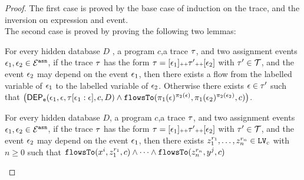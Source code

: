 {\begin{proof}
%
The first case is proved by the base case of induction on the trace, and the inversion on expression and event.
\\
The second case is proved by proving the following two lemmas:
\begin{lem}
  \label{lem:depevents_exist}
For every hidden database $D$ , a program $c$,a trace $\mathtt{\tau}$, and two assignment events 
$\mathtt{\epsilon}_1, \mathtt{\epsilon}_2 \in \mathcal{E}^{\mathtt{{asn}}}$,
if the trace $\mathtt{\tau}$ has the form $\mathtt{\tau} = [\mathtt{\epsilon}_1] {\scriptscriptstyle ++} \mathtt{\tau}' {\scriptscriptstyle ++} [\mathtt{\epsilon}_2]$ with $\mathtt{\tau}' \in \mathcal{T}$, 
and the event $\mathtt{\epsilon}_2$ may depend on the event $\mathtt{\epsilon}_1$, 
then there exists a flow from the labelled variable of $\mathtt{\epsilon}_1$ to 
the labelled variable of $\mathtt{\epsilon}_2$.  
 Otherwise there exists
$\mathtt{\epsilon} \in \mathtt{\tau}'$ such that
$\left( 		
    \eventdep(\event_1, \event, \trace[\event_1:\event], c, D)
\land 
\flowsto(\pi_1(\event)^{\pi_2(\event)}, \pi_1(\event_2)^{\pi_2(\event_2)}, c) 
\right)$.
%
\end{lem}
\begin{thm}
  \label{thm:flowsto_event_soundness}
  For every hidden database $D$, a program $c$,a trace $\mathtt{\tau}$, and two assignment events 
$\mathtt{\epsilon}_1, \mathtt{\epsilon}_2 \in \mathcal{E}^{\mathtt{{asn}}}$, 
if the trace $\mathtt{\tau}$ has the form $\mathtt{\tau} = [\mathtt{\epsilon}_1] {\scriptscriptstyle ++} \mathtt{\tau}' {\scriptscriptstyle ++} [\mathtt{\epsilon}_2]$ with $\mathtt{\tau}' \in \mathcal{T}$, 
and the event $\mathtt{\epsilon}_2$ may depend on the event $\mathtt{\epsilon}_1$,  then there exists
    $z_1^{r_1}, \ldots, z_n^{r_n} \in \mathtt{LV}_{{c}}$ with $n \geq 0$ such that   
  $\mathtt{flowsTo}(x^i,  z_1^{r_1}, c) 
  \land \cdots \land \mathtt{flowsTo}(z_n^{r_n}, y^j, c)$

\end{thm}
\end{proof}}
